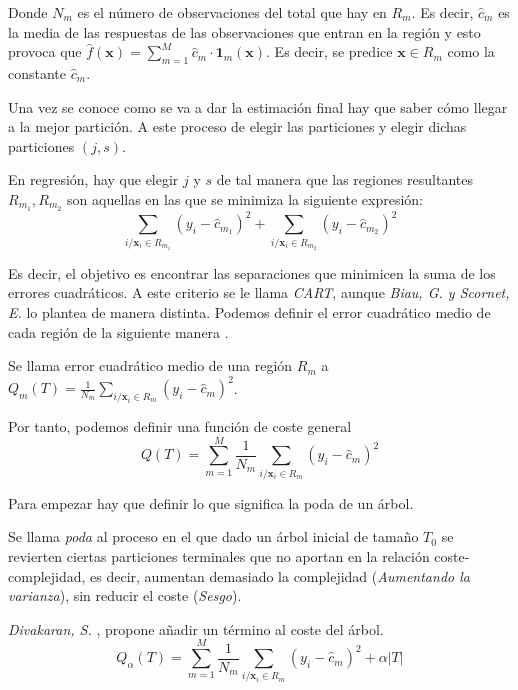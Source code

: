 \noindent Donde $N_m$ es el número de observaciones del total que hay en $R_m$. Es decir, $\hat{c}_m$ es la media de las respuestas de las observaciones que entran en la región y esto provoca que $\hat{f}(\mathbf{x})=\sum_{m=1}^M \hat{c}_m \cdot \mathbf{1}_m(\mathbf{x})$. Es decir, se predice $\mathbf{x}\in R_m$ como la constante $\hat{c}_m$. \cite{Hastie 2001}

\noindent Una vez se conoce como se va a dar la estimación final hay que saber cómo llegar a la mejor partición. A este proceso de elegir las particiones y elegir dichas particiones $(j,s)$. 

\noindent En regresión, hay que elegir $j$ y $s$ de tal manera que las regiones resultantes $R_{m_1},R_{m_2}$ son aquellas en las que se minimiza la siguiente expresión:
\begin{equation}
\sum_{i/\mathbf{x}_i\in R_{m_1} } (y_i-\hat{c}_{m_1})^2+\sum_{i/\mathbf{x}_i\in R_{m_2} } (y_i-\hat{c}_{m_2})^2
\end{equation}

\noindent Es decir, el objetivo es encontrar las separaciones que minimicen la suma de los errores cuadráticos. A este criterio se le llama \emph{CART}, aunque \emph{Biau, G. y Scornet, E.}\cite{Biau 2016} lo plantea de manera distinta. Podemos definir el error cuadrático medio de cada región de la siguiente manera \cite{Hastie 2001}.

\begin{defi}
Se llama error cuadrático medio de una región $R_m$ a $Q_m(T)=\frac{1}{N_m}\sum_{i/\mathbf{x}_i\in R_m}(y_i-\hat{c}_m)^2$.
\end{defi}

\noindent Por tanto, podemos definir una función de coste general 
\begin{equation}
Q(T)=\sum_{m=1}^M\frac{1}{N_m}\sum_{i/\mathbf{x}_i\in R_m} (y_i-\hat{c}_m)^2
\end{equation}

\noindent Para empezar hay que definir lo que significa la poda de un árbol. 
\begin{defi}
Se llama \emph{poda} al proceso en el que dado un árbol inicial de tamaño $T_0$ se revierten ciertas particiones terminales que no aportan en la relación coste-complejidad, es decir, aumentan demasiado la complejidad (\emph{Aumentando la varianza}), sin reducir el coste (\emph{Sesgo}).
\end{defi}

\noindent \emph{Divakaran, S. }\cite{Divakaran 2022}, propone añadir un término al coste del árbol. 
\begin{equation}
Q_{\alpha}(T)=\sum_{m=1}^M\frac{1}{N_m}\sum_{i/\mathbf{x}_i\in R_m} (y_i-\hat{c}_m)^2+\alpha|T |
\end{equation}

